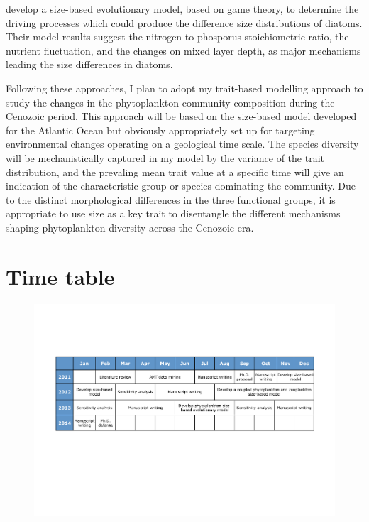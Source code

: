\citet{Jiang2005,Litchman2009} develop a size-based evolutionary model, based on game theory, to determine the driving processes which could produce  the difference size distributions of diatoms. Their model results suggest the nitrogen to phosporus stoichiometric ratio, the nutrient fluctuation, and the changes on mixed layer depth, as major mechanisms leading the size differences in diatoms. 

Following these approaches, I plan to adopt my trait-based modelling approach to study the changes in the phytoplankton community composition during the Cenozoic period. This approach will be based on the size-based model developed for the Atlantic Ocean but obviously appropriately set up for targeting environmental changes operating on a geological time scale. The species diversity will be mechanistically captured in my model  by the variance of the trait distribution, and the prevaling mean trait value at a specific time will give an indication of the characteristic group or species dominating the community. Due to the distinct morphological differences in the three functional groups, it is appropriate to use size as a key trait to disentangle the different mechanisms shaping phytoplankton diversity across the Cenozoic era. 

\newpage

\section{Time table} 

\begin{figure}[h]
\centering
\includegraphics[trim = 20mm 25mm 20mm 25mm, clip, width=1\linewidth]{./Chp3-Further/Chronogram.pdf}
\end{figure}

